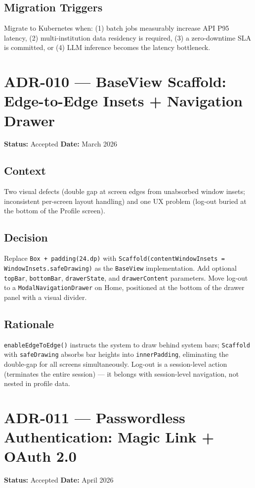 \subsection*{Migration Triggers}
Migrate to Kubernetes when: (1) batch jobs measurably increase API P95 latency, (2) multi-institution data residency is required, (3) a zero-downtime SLA is committed, or (4) LLM inference becomes the latency bottleneck.

\section{ADR-010 — BaseView Scaffold: Edge-to-Edge Insets + Navigation Drawer}
\label{adr:010}
\textbf{Status:} Accepted \quad \textbf{Date:} March 2026

\subsection*{Context}
Two visual defects (double gap at screen edges from unabsorbed window insets; inconsistent per-screen layout handling) and one UX problem (log-out buried at the bottom of the Profile screen).

\subsection*{Decision}
Replace \texttt{Box + padding(24.dp)} with \texttt{Scaffold(contentWindowInsets = WindowInsets.safeDrawing)} as the \texttt{BaseView} implementation. Add optional \texttt{topBar}, \texttt{bottomBar}, \texttt{drawerState}, and \texttt{drawerContent} parameters. Move log-out to a \texttt{ModalNavigationDrawer} on Home, positioned at the bottom of the drawer panel with a visual divider.

\subsection*{Rationale}
\texttt{enableEdgeToEdge()} instructs the system to draw behind system bars; \texttt{Scaffold} with \texttt{safeDrawing} absorbs bar heights into \texttt{innerPadding}, eliminating the double-gap for all screens simultaneously. Log-out is a session-level action (terminates the entire session) — it belongs with session-level navigation, not nested in profile data.

\section{ADR-011 — Passwordless Authentication: Magic Link + OAuth 2.0}
\label{adr:011}
\textbf{Status:} Accepted \quad \textbf{Date:} April 2026

